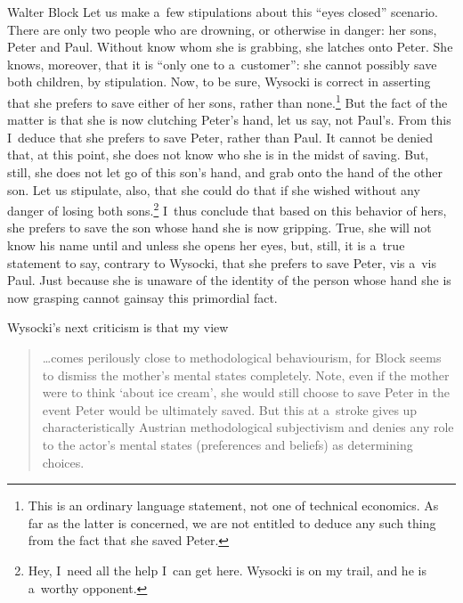 \begin{artengenv}{Walter Block}
Let us make a~few stipulations about this ``eyes closed'' scenario. There are only two people who are drowning, or otherwise in danger: her sons, Peter and Paul. Without know whom she is grabbing, she latches onto Peter. She knows, moreover, that it is ``only one to a~customer'': she cannot possibly save both children, by stipulation. Now, to be sure, Wysocki is correct in asserting that she prefers to save either of her sons, rather than none.\footnote{This is an ordinary language statement, not one of technical economics. As far as the latter is concerned, we are not entitled to deduce any such thing from the fact that she saved Peter.} But the fact of the matter is that she is now clutching Peter's hand, let us say, not Paul's. From this I~deduce that she prefers to save Peter, rather than Paul. It cannot be denied that, at this point, she does not know who she is in the midst of saving. But, still, she does not let go of this son's hand, and grab onto the hand of the other son. Let us stipulate, also, that she could do that if she wished without any danger of losing both sons.\footnote{Hey, I~need all the help I~can get here. Wysocki is on my trail, and he is a~worthy opponent.} I~thus conclude that based on this behavior of hers, she prefers to save the son whose hand she is now gripping. True, she will not know his name until and unless she opens her eyes, but, still, it is a~true statement to say, contrary to Wysocki, that she prefers to save Peter, vis a~vis Paul. Just because she is unaware of the identity of the person whose hand she is now grasping cannot gainsay this primordial fact.



Wysocki's next criticism is that my view



\begin{quote}
…comes perilously close to methodological behaviourism, for Block seems to dismiss the mother's mental states completely. Note, even if the mother were to think ‘about ice cream', she would still choose to save Peter in the event Peter would be ultimately saved. But this at a~stroke gives up characteristically Austrian methodological subjectivism and denies any role to the actor's mental states (preferences and beliefs) as determining choices.
\end{quote}




\end{artengenv}
